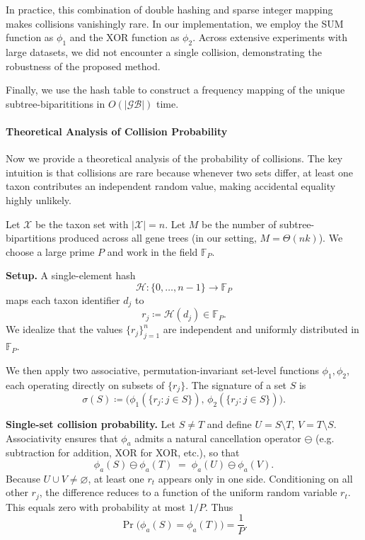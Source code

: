 \documentclass[10pt,a4paper]{article}
\begin{document}
In practice, this combination of double hashing and sparse integer mapping makes collisions vanishingly rare. In our implementation, we employ the SUM function as $\phi_1$ and the XOR function as $\phi_2$. Across extensive experiments with large datasets, we did not encounter a single collision, demonstrating the robustness of the proposed method.

Finally, we use the hash table to construct a frequency mapping of the unique subtree-biparititions in $O(\mathcal{|GB|})$ time.








\paragraph{Theoretical Analysis of Collision Probability}  

Now we provide a theoretical analysis of the probability of collisions. The key intuition is that collisions are rare because whenever two sets differ, at least one taxon contributes an independent random value, making accidental equality highly unlikely.

Let $\mathcal{X}$ be the taxon set with $|\mathcal{X}|=n$. Let $M$ be the number of subtree-bipartitions produced across all gene trees (in our setting, $M=\Theta(nk)$). We choose a large prime $P$ and work in the field $\mathbb{F}_P$.

\textbf{Setup.} A single-element hash
\[
\mathcal{H}:\{0,\dots,n-1\}\to\mathbb{F}_P
\]
maps each taxon identifier $d_j$ to
\[
r_j \coloneqq \mathcal{H}(d_j)\in\mathbb{F}_P.
\]
We idealize that the values $\{r_j\}_{j=1}^n$ are independent and uniformly distributed in $\mathbb{F}_P$.

We then apply two associative, permutation-invariant set-level functions $\phi_1,\phi_2$, each operating directly on subsets of $\{r_j\}$. The signature of a set $S$ is
\[
\sigma(S) \coloneqq \big(\phi_1(\{r_j:j\in S\}),\, \phi_2(\{r_j:j\in S\})\big).
\]

\textbf{Single-set collision probability.}  
Let $S\neq T$ and define $U=S\setminus T$, $V=T\setminus S$. Associativity ensures that $\phi_a$ admits a natural cancellation operator $\ominus$ (e.g. subtraction for addition, XOR for XOR, etc.), so that
\[
\phi_a(S)\ominus\phi_a(T) \;=\; \phi_a(U)\ominus\phi_a(V).
\]
Because $U\cup V\neq\varnothing$, at least one $r_t$ appears only in one side. Conditioning on all other $r_j$, the difference reduces to a function of the uniform random variable $r_t$. This equals zero with probability at most $1/P$. Thus
\begin{equation}\label{eq:single-hash}
\Pr\big(\phi_a(S)=\phi_a(T)\big) = \frac{1}{P}.
\end{equation}
\end{document}
